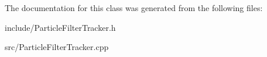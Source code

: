 The documentation for this class was generated from the following files\+:\begin{DoxyCompactItemize}
\item 
include/Particle\+Filter\+Tracker.\+h\item 
src/Particle\+Filter\+Tracker.\+cpp\end{DoxyCompactItemize}
